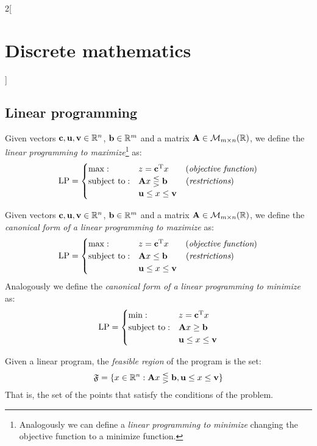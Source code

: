 \documentclass[../../../main.tex]{subfiles}
\begin{document}
\begin{multicols}{2}[\section{Discrete mathematics}]
  \subsection{Linear programming}
  \begin{definition}
    Given vectors $\boldsymbol{\mathrm{c}},\boldsymbol{\mathrm{u}},\boldsymbol{\mathrm{v}}\in\mathbb{R} ^n$, $\boldsymbol{\mathrm{b}}\in\mathbb{R} ^m$ and a matrix $\boldsymbol{\mathrm{A}}\in\mathcal{M}_{m\times n}(\mathbb{R} )$, we define the \emph{linear programming to maximize}\footnote{Analogously we can define a \emph{linear programming to minimize} changing the objective function to a minimize function.} as: $$\text{LP}=
      \begin{cases}
        \max:              & z=\vb{\boldsymbol{\mathrm{c}}}^{\mathrm{T}}x\qquad    (\emph{objective function}) \\
        \text{subject to}: & \boldsymbol{\mathrm{A}}x\lesseqgtr \boldsymbol{\mathrm{b}}\qquad\, (\emph{restrictions})     \\
                           & \boldsymbol{\mathrm{u}}\leq x\leq \boldsymbol{\mathrm{v}}
      \end{cases}$$
  \end{definition}
  \begin{definition}
    Given vectors $\boldsymbol{\mathrm{c}},\boldsymbol{\mathrm{u}},\boldsymbol{\mathrm{v}}\in\mathbb{R} ^n$, $\boldsymbol{\mathrm{b}}\in\mathbb{R} ^m$ and a matrix $\boldsymbol{\mathrm{A}}\in\mathcal{M}_{m\times n}(\mathbb{R} )$, we define the \emph{canonical form of a linear programming to maximize} as: $$\text{LP}=
      \begin{cases}
        \max:              & z=\vb{\boldsymbol{\mathrm{c}}}^{\mathrm{T}}x\qquad   (\emph{objective function}) \\
        \text{subject to}: & \boldsymbol{\mathrm{A}}x\leq \boldsymbol{\mathrm{b}}\qquad\,      (\emph{restrictions} )    \\
                           & \boldsymbol{\mathrm{u}}\leq x\leq \boldsymbol{\mathrm{v}}
      \end{cases}$$
    Analogously we define the \emph{canonical form of a linear programming to minimize} as: $$\text{LP}=
      \begin{cases}
        \min:              & z=\vb{\boldsymbol{\mathrm{c}}}^{\mathrm{T}}x   \\
        \text{subject to}: & \boldsymbol{\mathrm{A}}x\geq \boldsymbol{\mathrm{b}}      \\
                           & \boldsymbol{\mathrm{u}}\leq x\leq \boldsymbol{\mathrm{v}}
      \end{cases}$$
  \end{definition}
  \begin{definition}
    Given a linear program, the \emph{feasible region} of the program is the set: $$\mathfrak{F}=\{x\in\mathbb{R} ^n:\boldsymbol{\mathrm{A}}x\lesseqgtr \boldsymbol{\mathrm{b}},\boldsymbol{\mathrm{u}}\leq x\leq \boldsymbol{\mathrm{v}}\}$$ That is, the set of the points that satisfy the conditions of the problem.

\end{definition}
\end{multicols}
\end{document}
